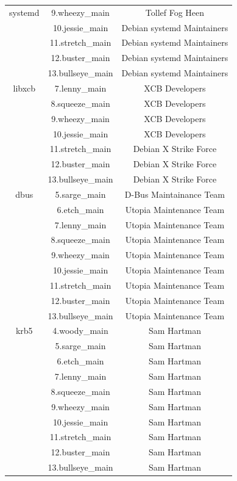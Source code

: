 \documentclass[a4paper, 12pt]{book}
\begin{document}
\begin{longtable}{|c|c|c|}
		\hline
		systemd & 9.wheezy\_main & Tollef Fog Heen \\
		& 10.jessie\_main & Debian systemd Maintainers \\
		& 11.stretch\_main & Debian systemd Maintainers \\
		& 12.buster\_main & Debian systemd Maintainers \\
		& 13.bullseye\_main & Debian systemd Maintainers \\
		\hline
		libxcb & 7.lenny\_main & XCB Developers \\
		& 8.squeeze\_main & XCB Developers \\
		& 9.wheezy\_main & XCB Developers \\
		& 10.jessie\_main & XCB Developers \\
		& 11.stretch\_main & Debian X Strike Force \\
		& 12.buster\_main & Debian X Strike Force \\
		& 13.bullseye\_main & Debian X Strike Force \\
		\hline
		dbus & 5.sarge\_main & D-Bus Maintainance Team \\
		& 6.etch\_main & Utopia Maintenance Team \\
		& 7.lenny\_main & Utopia Maintenance Team \\
		& 8.squeeze\_main & Utopia Maintenance Team \\
		& 9.wheezy\_main & Utopia Maintenance Team \\
		& 10.jessie\_main & Utopia Maintenance Team \\
		& 11.stretch\_main & Utopia Maintenance Team \\
		& 12.buster\_main & Utopia Maintenance Team \\
		& 13.bullseye\_main & Utopia Maintenance Team \\
		\hline
		krb5 & 4.woody\_main & Sam Hartman \\
		& 5.sarge\_main & Sam Hartman \\
		& 6.etch\_main & Sam Hartman \\
		& 7.lenny\_main & Sam Hartman \\
		& 8.squeeze\_main & Sam Hartman \\
		& 9.wheezy\_main & Sam Hartman \\
		& 10.jessie\_main & Sam Hartman \\
		& 11.stretch\_main & Sam Hartman \\
		& 12.buster\_main & Sam Hartman \\
		& 13.bullseye\_main & Sam Hartman \\

\end{longtable}
\end{document}
